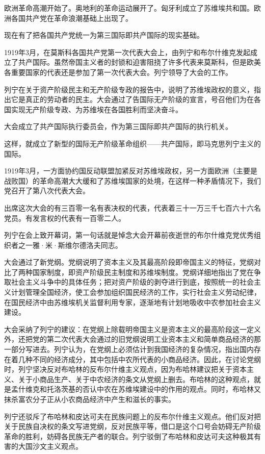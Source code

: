 欧洲革命高潮开始了。奥地利的革命运动展开了。匈牙利成立了苏维埃共和国。欧洲各国共产党在革命浪潮基础上出现了。

现在有了把各国共产党统一为第三国际即共产国际的现实基础。

1919年3月，在莫斯科各国共产党第一次代表大会上，由列宁和布尔什维克发起成立了共产国际。虽然帝国主义者的封锁和迫害阻挠了许多代表来莫斯科，但是欧美各重要国家的代表还是参加了第一次代表大会。列宁领导了大会的工作。

列宁在关于资产阶级民主和无产阶级专政的报告中，说明了苏维埃政权的意义，指出它是真正的劳动者的民主。大会通过了告国际无产阶级的宣言，号召他们为在各国实现无产阶级专政、为苏维埃在各国胜利而坚决奋斗。

大会成立了共产国际执行委员会，作为第三国际即共产国际的执行机关。

这样，就成立了新型的国际无产阶级革命组织——共产国际，即马克思列宁主义的国际。

1919年3月，一方面协约国反动联盟加紧反对苏维埃政权，另一方面欧洲（主要是战败国）的革命高潮大大缓和了苏维埃国家的处境，在这样一种矛盾情况下，我们党召开了第八次代表大会。

出席这次大会的有三百零一名有表决权的代表，代表着三十一万三千七百六十六名党员。有发言权的代表有一百零二人。

列宁在会上致开幕词，第一句话就是悼念大会开幕前夜逝世的布尔什维克党优秀组织者之一雅·米·斯维尔德洛夫同志。

大会通过了新党纲。党纲说明了资本主义及其最高阶段即帝国主义的特征，党纲对比了两种国家制度，即资产阶级民主制度和苏维埃制度。党纲详细地指出了党在争取社会主义斗争中的具体任务；把对资产阶级的剥夺进行到底，按照统一的社会主义计划管理全国经济，使工会参加组织国民经济的工作，实行社会主义劳动纪律，在国民经济中由苏维埃机关监督利用专家，逐渐地有计划地吸收中农参加社会主义建设。

大会采纳了列宁的建议：在党纲上除载明帝国主义是资本主义的最高阶段这一定义外，还把党的第二次代表大会通过的旧党纲说明工业资本主义和简单商品经济的那一部分写进去。列宁认为，在党纲上必须估计到我国经济的复杂情况，指出国内存在着几种不同的经济成分，其中包括中农所代表的小商品经济。因此，在讨论党纲时，列宁坚决反对布哈林的反布尔什维主义观点，因为布哈林建议把关于资本主义、关于小商品生产、关于中农经济的条文从党纲上删去。布哈林的这种观点，就是孟什维克和托洛茨基的否认中农在苏维埃建设中的作用的观点。同时，布哈林又抹杀富农分子正从小农商品经济中产生和滋长的事实。

列宁还驳斥了布哈林和皮达可夫在民族问题上的反布尔什维主义观点。他们反对把关于民族自决权的条文写进党纲，反对民族平等，借口是这个口号会妨碍无产阶级革命的胜利，妨碍各民族无产者的联合。列宁驳倒了布哈林和皮达可夫这种极其有害的大国沙文主义观点。

